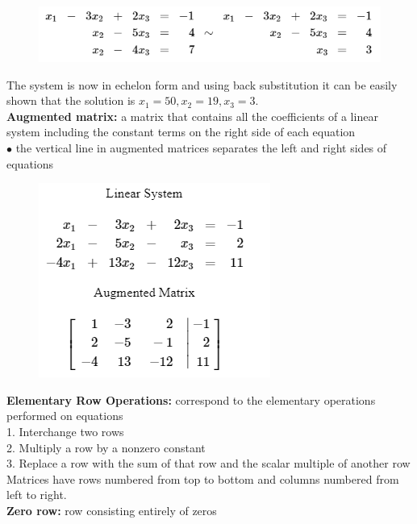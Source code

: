         \begin{figure}[hbt!]
            \centering
            \includegraphics[scale = 0.75]{Assets/1_Transformation_Example3}
        \end{figure}

        The system is now in echelon form and using back substitution it can be easily shown that the solution is $x_1=50, x_2 = 19, x_3 = 3$. \\

        \textbf{Augmented matrix:} a matrix that contains all the coefficients of a linear system including the constant terms on the right side of each equation \\
        $\bullet$ the vertical line in augmented matrices separates the left and right sides of equations

        \begin{figure}[hbt!]
            \centering
            \includegraphics[scale = 0.75]{Assets/1_Augmented_Matrix}
        \end{figure}

        \textbf{Elementary Row Operations:} correspond to the elementary operations performed on equations \\
        1. Interchange two rows \\
        2. Multiply a row by a nonzero constant \\
        3. Replace a row with the sum of that row and the scalar multiple of another row \\

        Matrices have rows numbered from top to bottom and columns numbered from left to right. \\
        \textbf{Zero row:} row consisting entirely of zeros \\

